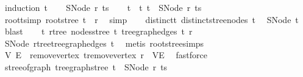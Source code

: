 \begin{isabellebody}
%
\isadelimproof
%
\endisadelimproof
%
\isatagproof
{}\isamarkupfalse%
\ {\isacharparenleft}{\kern0pt}induction\ t{\isacharparenright}{\kern0pt}\isanewline
\ \ \isamarkupfalse%
\ {\isacharparenleft}{\kern0pt}SNode\ r\ ts{\isacharparenright}{\kern0pt}\isanewline
\ \ \isamarkupfalse%
\ t\ \ t{\isacharcolon}{\kern0pt}\ {\isachardoublequoteopen}t\ {\isacharequal}{\kern0pt}\ SNode\ r\ ts{\isachardoublequoteclose}\isanewline
\ \ \isamarkupfalse%
\ \isamarkupfalse%
\ root{\isacharunderscore}{\kern0pt}t{\isacharbrackleft}{\kern0pt}simp{\isacharbrackright}{\kern0pt}{\isacharcolon}{\kern0pt}\ {\isachardoublequoteopen}root{\isacharunderscore}{\kern0pt}stree\ t\ {\isacharequal}{\kern0pt}\ r{\isachardoublequoteclose}\ \isamarkupfalse%
\ simp\isanewline
\ \ \isamarkupfalse%
\ distinct{\isacharunderscore}{\kern0pt}t{\isacharcolon}{\kern0pt}\ {\isachardoublequoteopen}distinct{\isacharunderscore}{\kern0pt}stree{\isacharunderscore}{\kern0pt}nodes\ t{\isachardoublequoteclose}\ \isamarkupfalse%
\ SNode{\isacharparenleft}{\kern0pt}{}{\isacharparenright}{\kern0pt}\ t\ \isamarkupfalse%
\ blast\isanewline
\ \ \isamarkupfalse%
\ t{\isacharcolon}{\kern0pt}\ rtree\ {\isachardoublequoteopen}nodes{\isacharunderscore}{\kern0pt}stree\ t{\isachardoublequoteclose}\ {\isachardoublequoteopen}tree{\isacharunderscore}{\kern0pt}graph{\isacharunderscore}{\kern0pt}edges\ t{\isachardoublequoteclose}\ r\ \isamarkupfalse%
\ SNode{\isacharparenleft}{\kern0pt}{}{\isacharparenright}{\kern0pt}\ rtree{\isacharunderscore}{\kern0pt}tree{\isacharunderscore}{\kern0pt}graph{\isacharunderscore}{\kern0pt}edges\ t\ \isamarkupfalse%
\ {\isacharparenleft}{\kern0pt}metis\ root{\isacharunderscore}{\kern0pt}stree{\isachardot}{\kern0pt}simps{\isacharparenright}{\kern0pt}\isanewline
\ \ \isamarkupfalse%
\ V{\isacharprime}{\kern0pt}\ E{\isacharprime}{\kern0pt}\ \ remove{\isacharunderscore}{\kern0pt}vertex{\isacharcolon}{\kern0pt}\ {\isachardoublequoteopen}t{\isachardot}{\kern0pt}remove{\isacharunderscore}{\kern0pt}vertex\ r\ {\isacharequal}{\kern0pt}\ {\isacharparenleft}{\kern0pt}V{\isacharprime}{\kern0pt}{\isacharcomma}{\kern0pt}E{\isacharprime}{\kern0pt}{\isacharparenright}{\kern0pt}{\isachardoublequoteclose}\ \isamarkupfalse%
\ fastforce\isanewline
\isanewline
\ \ \isamarkupfalse%
\ {\isachardoublequoteopen}stree{\isacharunderscore}{\kern0pt}of{\isacharunderscore}{\kern0pt}graph\ {\isacharparenleft}{\kern0pt}tree{\isacharunderscore}{\kern0pt}graph{\isacharunderscore}{\kern0pt}stree\ t{\isacharparenright}{\kern0pt}\ {\isacharequal}{\kern0pt}\ SNode\ r\ ts{\isachardoublequoteclose}\ \isamarkupfalse%

\end{isabellebody}
